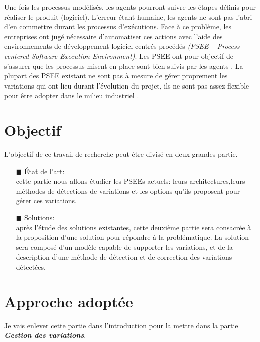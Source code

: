 Une fois les processus modélisés, les agents pourront suivre les étapes définis pour réaliser le produit (logiciel). L'erreur étant humaine, les agents ne sont pas l'abri d'en commettre durant les processus d'exécutions. Face à ce problème, les entreprises ont jugé nécessaire d'automatiser ces actions avec l'aide des environnements de développement logiciel centrés procédés \textit{(PSEE – Process-centered Software Execution Environment)}. Les PSEE ont pour objectif de s'assurer que les processus misent en place sont bien suivis par les agents \cite{alm1}. La plupart des PSEE existant ne sont pas à mesure de gérer proprement les variations qui ont lieu durant l'évolution du projet, ils ne sont pas assez flexible pour être adopter dans le milieu industriel \cite{kabaaj20}.\\ 


\section{Objectif}
L'objectif de ce travail de recherche peut être divisé en deux grandes partie. \\
\begin{itemize}
\item[\tiny{$\blacksquare$}] État de l'art: \\
cette partie nous allons étudier les PSEEs actuels: leurs architectures,leurs méthodes de détections de variations et les options qu'ils proposent pour gérer ces variations. \\
\item[\tiny{$\blacksquare$}] Solutions: \\
après l'étude des solutions existantes, cette deuxième partie sera consacrée à la proposition d'une solution pour répondre à la problématique. La solution sera composé d'un modèle capable de supporter les variations, et de la description d'une méthode de détection et de correction des variations détectées.
\end{itemize}

\section{Approche adoptée}
Je vais enlever cette partie dans l'introduction pour la mettre dans la partie \textbf{\textit{Gestion des variations}}.
